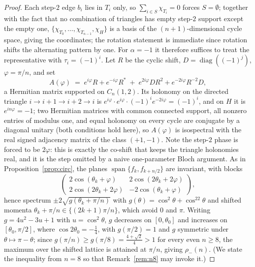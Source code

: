 \documentclass[11pt]{article}
\theoremstyle{remark}
\begin{document}
\begin{proof}
Each step-$2$ edge $b_i$ lies in $T_i$ only, so
$\sum_{i\in S}\chi_{T_i}=0$ forces $S=\emptyset$; together with the fact
that no combination of triangles has empty step-$2$ support except the
empty one, $\{\chi_{T_0},\dots,\chi_{T_{n-1}},\chi_H\}$ is a basis of
the $(n{+}1)$-dimensional cycle space, giving the coordinates; the
rotation statement is immediate since rotation shifts the alternating
pattern by one. For $\alpha=-1$ it therefore suffices to treat the
representative with $\tau_i=(-1)^i$. Let $R$ be the cyclic shift,
$D=\operatorname{diag}((-1)^j)$, $\varphi=\pi/n$, and set
\[
A(\varphi)\;=\;e^{i\varphi}R+e^{-i\varphi}R^{*}
\;+\;e^{2i\varphi}DR^{2}+e^{-2i\varphi}R^{-2}D ,
\]
a Hermitian matrix supported on $C_n(1,2)$. Its holonomy on the directed
triangle $i\to i{+}1\to i{+}2\to i$ is
$e^{i\varphi}\cdot e^{i\varphi}\cdot(-1)^ie^{-2i\varphi}=(-1)^i$, and on
$H$ it is $e^{in\varphi}=-1$; two Hermitian matrices with common connected support, all nonzero
entries of modulus one, and equal holonomy on every cycle are
conjugate by a diagonal unitary (both conditions hold here), so $A(\varphi)$ is isospectral with the real signed
adjacency matrix of the class $(+1,-1)$. Note the step-$2$ phase is
forced to be $2\varphi$: this is exactly the co-shift that keeps the
triangle holonomies real, and it is the step omitted by a naive
one-parameter Bloch argument. As in Proposition~\ref{prop:circ}, the
planes $\operatorname{span}\{f_k,f_{k+n/2}\}$ are invariant, with blocks
\[
\begin{pmatrix}
2\cos(\theta_k{+}\varphi)&2\cos(2\theta_k{+}2\varphi)\\
2\cos(2\theta_k{+}2\varphi)&-2\cos(\theta_k{+}\varphi)
\end{pmatrix},
\]
hence spectrum $\pm2\sqrt{g(\theta_k+\pi/n)}$ with
$g(\theta)=\cos^2\theta+\cos^22\theta$ and shifted momenta
$\theta_k+\pi/n\in\{(2k{+}1)\pi/n\}$, which avoid $0$ and $\pi$. Writing
$g=4u^2-3u+1$ with $u=\cos^2\theta$, $g$ decreases on $[0,\theta_0]$ and increases on
$[\theta_0,\pi/2]$, where $\cos2\theta_0=-\tfrac14$, with
$g(\pi/2)=1$ and $g$ symmetric under $\theta\mapsto\pi-\theta$;
since $g(\pi/n)\ge g(\pi/8)=\tfrac{4+\sqrt2}{4}>1$ for every even
$n\ge8$, the maximum over the shifted lattice is attained at $\pi/n$,
giving $\rho_-(n)$. (We state the inequality from $n=8$ so that
Remark~\ref{rem:n8} may invoke it.)
\end{proof}
\end{document}
